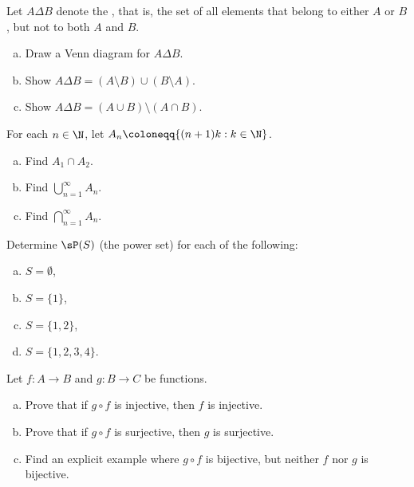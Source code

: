 \begin{samepage}
\begin{exercise}
Let $A \Delta B$ denote the
\emph{}, that is, the set of all elements that
belong to either $A$ or $B$, but not to both $A$ and $B$.
\begin{enumerate}[a)]
\item
Draw a Venn diagram for
$A \Delta B$.
\item
Show $A \Delta B = (A \setminus B) \cup (B \setminus A)$.
\item
Show $A \Delta B = (A \cup B) \setminus ( A \cap B)$.
\end{enumerate}
\end{exercise}
\end{samepage}

\begin{exercise}
For each $n \in \N$, let $A_n \coloneqq \{ (n+1)k : k \in \N \}$.
\begin{enumerate}[a)]
\item Find $A_1 \cap A_2$.
\item Find $\bigcup_{n=1}^\infty A_n$.
\item Find $\bigcap_{n=1}^\infty A_n$.
\end{enumerate}
\end{exercise}

\begin{samepage}
\begin{exercise}
Determine $\sP(S)$ (the power set) for each of the following:
\begin{enumerate}[a)]
\item $S = \emptyset$,
\item $S = \{1\}$,
\item $S = \{1,2\}$,
\item $S = \{1,2,3,4\}$.
\end{enumerate}
\end{exercise}
\end{samepage}


\begin{exercise}
Let $f \colon A \to B$ and $g \colon B \to C$ be functions.
\begin{enumerate}[a)]
\item
Prove that if $g \circ f$ is injective, then $f$ is injective.
\item
Prove that if $g \circ f$ is surjective, then $g$ is surjective.
\item
Find an explicit example where $g \circ f$ is bijective, but neither $f$
nor $g$ is bijective.
\end{enumerate}
\end{exercise}

